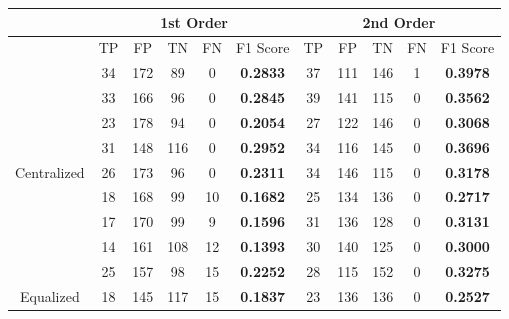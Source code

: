\documentclass[10pt,a4paper]{article}
\begin{document}
		\begin{table}[!h]
			\centering
			\begin{tabular}{|c|c|c|c|c|c|c|c|c|c|c|}
				\hline
				& \multicolumn{5}{c|}{1st Order}                                                      & \multicolumn{5}{c|}{2nd Order}                               \\ \hline
				& TP & FP  & TN  & FN                        & F1 Score                               & TP & FP  & TN  & FN & F1 Score                               \\ \hline
				& 34 & 172 & 89  & {\color[HTML]{333333} 0}  & {\color[HTML]{FE0000} \textbf{0.2833}} & 37 & 111 & 146 & 1  & {\color[HTML]{FE0000} \textbf{0.3978}} \\ \cline{2-11} 
				& 33 & 166 & 96  & {\color[HTML]{333333} 0}  & {\color[HTML]{FE0000} \textbf{0.2845}} & 39 & 141 & 115 & 0  & {\color[HTML]{FE0000} \textbf{0.3562}} \\ \cline{2-11} 
				& 23 & 178 & 94  & {\color[HTML]{333333} 0}  & {\color[HTML]{FE0000} \textbf{0.2054}} & 27 & 122 & 146 & 0  & {\color[HTML]{FE0000} \textbf{0.3068}} \\ \cline{2-11} 
				& 31 & 148 & 116 & {\color[HTML]{333333} 0}  & {\color[HTML]{FE0000} \textbf{0.2952}} & 34 & 116 & 145 & 0  & {\color[HTML]{FE0000} \textbf{0.3696}} \\ \cline{2-11} 
				\multirow{-5}{*}{Centralized} & 26 & 173 & 96  & {\color[HTML]{333333} 0}  & {\color[HTML]{FE0000} \textbf{0.2311}} & 34 & 146 & 115 & 0  & {\color[HTML]{FE0000} \textbf{0.3178}} \\ \hline
				& 18 & 168 & 99  & {\color[HTML]{333333} 10} & {\color[HTML]{FE0000} \textbf{0.1682}} & 25 & 134 & 136 & 0  & {\color[HTML]{FE0000} \textbf{0.2717}} \\ \cline{2-11} 
				& 17 & 170 & 99  & {\color[HTML]{333333} 9}  & {\color[HTML]{FE0000} \textbf{0.1596}} & 31 & 136 & 128 & 0  & {\color[HTML]{FE0000} \textbf{0.3131}} \\ \cline{2-11} 
				& 14 & 161 & 108 & {\color[HTML]{333333} 12} & {\color[HTML]{FE0000} \textbf{0.1393}} & 30 & 140 & 125 & 0  & {\color[HTML]{FE0000} \textbf{0.3000}} \\ \cline{2-11} 
				& 25 & 157 & 98  & {\color[HTML]{333333} 15} & {\color[HTML]{FE0000} \textbf{0.2252}} & 28 & 115 & 152 & 0  & {\color[HTML]{FE0000} \textbf{0.3275}} \\ \cline{2-11} 
				\multirow{-5}{*}{Equalized}   & 18 & 145 & 117 & {\color[HTML]{333333} 15} & {\color[HTML]{FE0000} \textbf{0.1837}} & 23 & 136 & 136 & 0  & {\color[HTML]{FE0000} \textbf{0.2527}} \\ \hline
			\end{tabular}
		\end{table}
	
\end{document}
